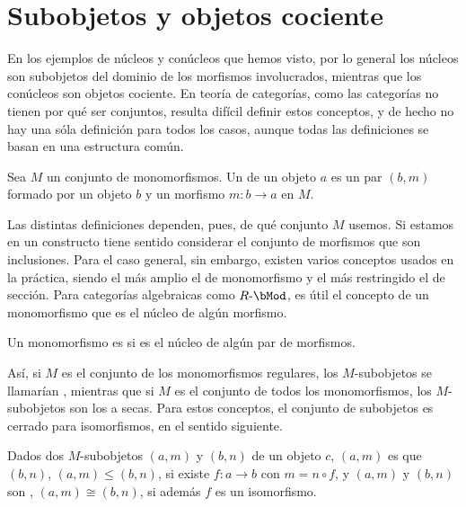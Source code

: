 \section{Subobjetos y objetos cociente}

En los ejemplos de núcleos y conúcleos que hemos visto, por lo general los
núcleos son subobjetos del dominio de los morfismos involucrados, mientras que
los conúcleos son objetos cociente. En teoría de categorías, como las categorías
no tienen por qué ser conjuntos, resulta difícil definir estos conceptos, y de
hecho no hay una sóla definición para todos los casos, aunque todas las
definiciones se basan en una estructura común.

\begin{definition}
  Sea $M$ un conjunto de monomorfismos. Un  de un objeto $a$
  es un par $(b,m)$ formado por un objeto $b$ y un morfismo $m:b\to a$ en $M$.
\end{definition}

Las distintas definiciones dependen, pues, de qué conjunto $M$ usemos. Si
estamos en un constructo tiene sentido considerar el conjunto de morfismos que
son inclusiones. Para el caso general, sin embargo, existen varios conceptos
usados en la práctica, siendo el más amplio el de monomorfismo y el más
restringido el de sección. Para categorías algebraicas como $R\dash\bMod$, es
útil el concepto de un monomorfismo que es el núcleo de algún morfismo.

\begin{definition}
  Un monomorfismo es  si es el núcleo de algún par de morfismos.
\end{definition}

Así, si $M$ es el conjunto de los monomorfismos regulares, los $M$-subobjetos se
llamarían , mientras que si $M$ es el conjunto de
todos los monomorfismos, los $M$-subobjetos son los  a
secas. Para estos conceptos, el conjunto de subobjetos es cerrado para
isomorfismos, en el sentido siguiente.

\begin{definition}
  Dados dos $M$-subobjetos $(a,m)$ y $(b,n)$ de un objeto $c$, $(a,m)$ es
   que $(b,n)$, $(a,m)\leq(b,n)$, si existe $f:a\to b$ con
  $m=n\circ f$, y $(a,m)$ y $(b,n)$ son , $(a,m)\cong(b,n)$, si
  además $f$ es un isomorfismo.
\end{definition}

